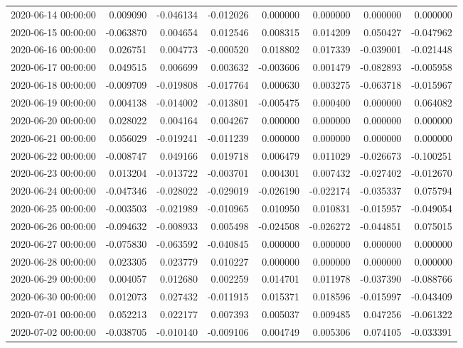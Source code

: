 \begin{tabular}{lrrrrrrr}
2020-06-14 00:00:00 & 0.009090 & -0.046134 & -0.012026 & 0.000000 & 0.000000 & 0.000000 & 0.000000 \\
2020-06-15 00:00:00 & -0.063870 & 0.004654 & 0.012546 & 0.008315 & 0.014209 & 0.050427 & -0.047962 \\
2020-06-16 00:00:00 & 0.026751 & 0.004773 & -0.000520 & 0.018802 & 0.017339 & -0.039001 & -0.021448 \\
2020-06-17 00:00:00 & 0.049515 & 0.006699 & 0.003632 & -0.003606 & 0.001479 & -0.082893 & -0.005958 \\
2020-06-18 00:00:00 & -0.009709 & -0.019808 & -0.017764 & 0.000630 & 0.003275 & -0.063718 & -0.015967 \\
2020-06-19 00:00:00 & 0.004138 & -0.014002 & -0.013801 & -0.005475 & 0.000400 & 0.000000 & 0.064082 \\
2020-06-20 00:00:00 & 0.028022 & 0.004164 & 0.004267 & 0.000000 & 0.000000 & 0.000000 & 0.000000 \\
2020-06-21 00:00:00 & 0.056029 & -0.019241 & -0.011239 & 0.000000 & 0.000000 & 0.000000 & 0.000000 \\
2020-06-22 00:00:00 & -0.008747 & 0.049166 & 0.019718 & 0.006479 & 0.011029 & -0.026673 & -0.100251 \\
2020-06-23 00:00:00 & 0.013204 & -0.013722 & -0.003701 & 0.004301 & 0.007432 & -0.027402 & -0.012670 \\
2020-06-24 00:00:00 & -0.047346 & -0.028022 & -0.029019 & -0.026190 & -0.022174 & -0.035337 & 0.075794 \\
2020-06-25 00:00:00 & -0.003503 & -0.021989 & -0.010965 & 0.010950 & 0.010831 & -0.015957 & -0.049054 \\
2020-06-26 00:00:00 & -0.094632 & -0.008933 & 0.005498 & -0.024508 & -0.026272 & -0.044851 & 0.075015 \\
2020-06-27 00:00:00 & -0.075830 & -0.063592 & -0.040845 & 0.000000 & 0.000000 & 0.000000 & 0.000000 \\
2020-06-28 00:00:00 & 0.023305 & 0.023779 & 0.010227 & 0.000000 & 0.000000 & 0.000000 & 0.000000 \\
2020-06-29 00:00:00 & 0.004057 & 0.012680 & 0.002259 & 0.014701 & 0.011978 & -0.037390 & -0.088766 \\
2020-06-30 00:00:00 & 0.012073 & 0.027432 & -0.011915 & 0.015371 & 0.018596 & -0.015997 & -0.043409 \\
2020-07-01 00:00:00 & 0.052213 & 0.022177 & 0.007393 & 0.005037 & 0.009485 & 0.047256 & -0.061322 \\
2020-07-02 00:00:00 & -0.038705 & -0.010140 & -0.009106 & 0.004749 & 0.005306 & 0.074105 & -0.033391 \\

\end{tabular}
